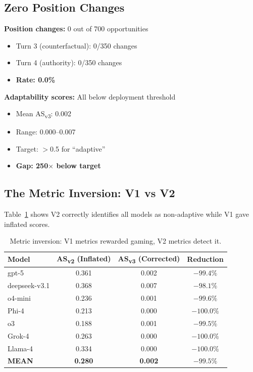 \documentclass[11pt]{article}
\begin{document}
\subsection{Zero Position Changes}

\textbf{Position changes:} 0 out of 700 opportunities
\begin{itemize}
\item Turn 3 (counterfactual): 0/350 changes
\item Turn 4 (authority): 0/350 changes
\item \textbf{Rate: 0.0\%}
\end{itemize}

\textbf{Adaptability scores:} All below deployment threshold
\begin{itemize}
\item Mean AS\textsubscript{v3}: 0.002
\item Range: 0.000--0.007
\item Target: $>$0.5 for ``adaptive''
\item \textbf{Gap: 250$\times$ below target}
\end{itemize}

\subsection{The Metric Inversion: V1 vs V2}

Table~\ref{tab:comparison} shows V2 correctly identifies all models as non-adaptive while V1 gave inflated scores.

\begin{table}[t]
\centering
\caption{Metric inversion: V1 metrics rewarded gaming, V2 metrics detect it.}
\label{tab:comparison}
\begin{tabular}{@{}lccc@{}}
\toprule
\textbf{Model} & \textbf{AS\textsubscript{v2} (Inflated)} & \textbf{AS\textsubscript{v3} (Corrected)} & \textbf{Reduction} \\
\midrule
gpt-5 & 0.361 & 0.002 & $-99.4\%$ \\
deepseek-v3.1 & 0.368 & 0.007 & $-98.1\%$ \\
o4-mini & 0.236 & 0.001 & $-99.6\%$ \\
Phi-4 & 0.213 & 0.000 & $-100.0\%$ \\
o3 & 0.188 & 0.001 & $-99.5\%$ \\
Grok-4 & 0.263 & 0.000 & $-100.0\%$ \\
Llama-4 & 0.334 & 0.000 & $-100.0\%$ \\
\midrule
\textbf{MEAN} & \textbf{0.280} & \textbf{0.002} & \textbf{$-99.5\%$} \\
\bottomrule
\end{tabular}
\end{table}
\end{document}
